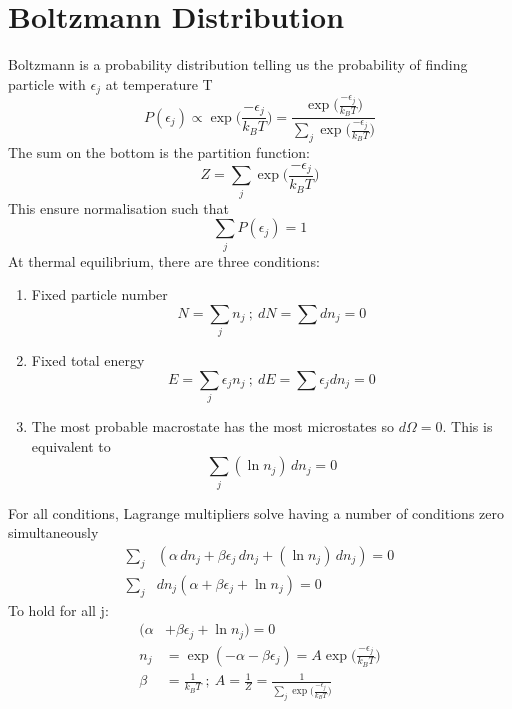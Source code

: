 \documentclass[a4paper, 11pt, normalem]{report}
\begin{document}
\section{Boltzmann Distribution}
Boltzmann is a probability distribution telling us the probability of finding particle with $\epsilon_j$ at temperature T
\begin{equation*}
    P(\epsilon_j) \propto \exp\Big(\frac{-\epsilon_j}{k_B T}\Big) = \frac{\exp\big(\tfrac{-\epsilon_j}{k_B T}\big)}{\sum_{j} \exp\big(\tfrac{-\epsilon_j}{k_B T}\big)}
\end{equation*}
The sum on the bottom is the partition function:
\begin{equation*}
    Z = \sum_{j} \exp\Big(\frac{-\epsilon_j}{k_B T}\Big)
\end{equation*}
This ensure normalisation such that
\begin{equation*}
    \sum_{j} P(\epsilon_j) = 1
\end{equation*}
At thermal equilibrium, there are three conditions:
\begin{enumerate}
    \item Fixed particle number
            \begin{equation*}
                N = \sum_j n_j ~;~ dN = \sum dn_j = 0
            \end{equation*}
    \item Fixed total energy
            \begin{equation*}
                E = \sum_{j} \epsilon_j n_j ~;~ dE = \sum \epsilon_j dn_j = 0
            \end{equation*}
    \item The most probable macrostate has the most microstates so $d\Omega = 0$. This is equivalent to
            \begin{equation*}
                \sum_{j} (\ln n_j)\,dn_j = 0
            \end{equation*}
\end{enumerate}
For all conditions, Lagrange multipliers solve having a number of conditions zero simultaneously
\begin{align*}
    \sum_{j}& (\alpha\,dn_j + \beta\epsilon_j\,dn_j + (\ln n_j)\,dn_j) = 0 \\
    \sum_{j}& dn_j (\alpha + \beta\epsilon_j + \ln n_j) = 0
\end{align*}
To hold for all j:
\begin{align*}
    (\alpha &+ \beta\epsilon_j + \ln n_j) = 0 \\
    n_j &= \exp(-\alpha - \beta\epsilon_j) = A\exp\Big(\frac{-\epsilon_j}{k_B T}\Big) \\
    \beta &= \frac{1}{k_B T} ~;~ A = \frac{1}{Z} = \frac{1}{\sum_{j} \exp\big(\tfrac{-\epsilon_j}{k_B T}\big)}
\end{align*}
\end{document}
